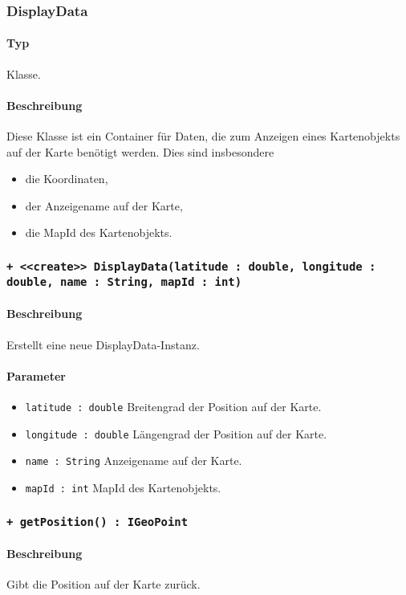 \subsubsection{DisplayData}
\paragraph*{Typ}
Klasse.
\paragraph*{Beschreibung}
Diese Klasse ist ein Container für Daten, die zum Anzeigen eines Kartenobjekts auf der 
Karte benötigt werden. Dies sind insbesondere
\begin{itemize}
    \item die Koordinaten,
    \item der Anzeigename auf der Karte,
    \item die MapId des Kartenobjekts.
\end{itemize}

\subsubsection*{\texttt{+ <<create>> DisplayData(latitude : double, longitude : double, name : String, mapId : int)}}%
\paragraph*{Beschreibung}
Erstellt eine neue DisplayData-Instanz.
\paragraph*{Parameter}
\begin{itemize}
    \item \texttt{latitude : double} Breitengrad der Position auf der Karte.
    \item \texttt{longitude : double} Längengrad der Position auf der Karte.
    \item \texttt{name : String} Anzeigename auf der Karte.
    \item \texttt{mapId : int} MapId des Kartenobjekts.
\end{itemize}

\subsubsection*{\texttt{+ getPosition() : IGeoPoint}}%
\paragraph*{Beschreibung}
Gibt die Position auf der Karte zurück.
